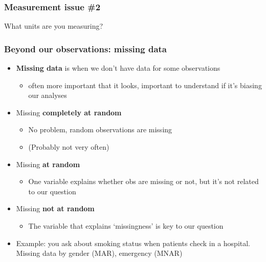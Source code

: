 \documentclass[aspectratio=43]{beamer}
\begin{document}



\begin{frame}
\frametitle{Measurement issue \#2}
\centering

What units are you  measuring?

\end{frame}

\begin{frame}
\frametitle{Beyond our observations: missing data}
\centering

\begin{itemize}
  \item \textbf{Missing data} is when we don't have data for some observations
  \begin{itemize}
    \item often more important that it looks, important to understand if it's biasing our analyses
  \end{itemize}
  \item<2->[1.] Missing \textbf{completely at random}
  \begin{itemize}
    \item No problem, random observations are missing
    \item[] (Probably not very often)
  \end{itemize}
  \item<3->[2.] Missing \textbf{at random}
  \begin{itemize}
    \item One variable explains whether obs are missing or not, but it's not related to our question
  \end{itemize}
  \item<4->[3.] Missing \textbf{not at random}
  \begin{itemize}
    \item The variable that explains `missingness' is key to our question
  \end{itemize}
  \item<4-> {\small Example: you ask about smoking status when patients check in a hospital. Missing data by gender (MAR), emergency (MNAR)}
\end{itemize}


\end{frame}
\end{document}
